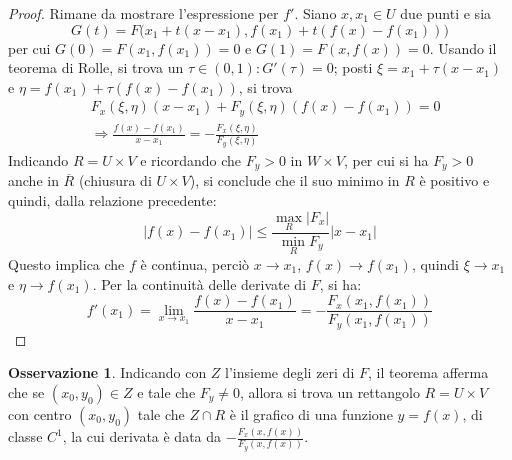 \documentclass[10pt, a4paper]{scrartcl}
\theoremstyle{definition}
\numberwithin{esempio}{section}
\theoremstyle{definition}
\newtheorem{obs}{Osservazione}
\numberwithin{obs}{section}
\numberwithin{nota}{section}
\numberwithin{equation}{subsection}
\begin{document}
\begin{teorema}
\begin{proof}
Rimane da mostrare l'espressione per $f'$.
Siano $x,x_1 \in U$ due punti e sia
\[
G(t)  = F\big(x_1+t(x-x_1),f(x_1) +  t (f(x)-f(x_1))\big)
\] 
per cui $G(0) =  F(x_1,f(x_1))  = 0$ e $G(1) = F(x,f(x))=0$. 
Usando il teorema di Rolle, si trova un $\tau  \in (0,1) :  G'(\tau ) = 0 $; posti $\xi  = x_1 + \tau (x-x_1)$ e $\eta = f(x_1) + \tau (f(x) - f(x_1))$, si trova
\[
\begin{split}
	&F_x(\xi ,\eta) (x-x_1) + F_y(\xi ,\eta)(f(x)-f(x_1)) = 0\\
	&\Rightarrow \frac{f(x) -f(x_1)}{x-x_1} = - \frac{F_x(\xi ,\eta)}{F_y(\xi ,\eta)}
\end{split}
\] 
Indicando $R = U \times V$ e ricordando che $F_y > 0$ in $W\times V$, per cui si ha $F_y > 0$ anche in $\overline{R}$ (chiusura di $U \times V$), si conclude che il suo minimo in $R$ \`e positivo e quindi, dalla relazione precedente:
\[
\lvert f(x) - f(x_1) \rvert \le \frac{\max_R \lvert F_x \rvert }{\min_R F_y}\lvert x-x_1 \rvert 
\] 
Questo implica che $f$ \`e continua, perci\`o $x\to x_1$, $f(x) \to f(x_1)$, quindi $\xi  \to  x_1$ e $\eta \to f(x_1)$.
Per la continuit\`a delle derivate di $F$, si ha:
\[
f'(x_1) =  \lim_{x \to x_1} \frac{f(x) - f(x_1)}{x-x_1}= -  \frac{F_x(x_1,f(x_1))}{F_y(x_1,f(x_1))}
\] 

\end{proof}
\end{teorema}



\begin{obs}
	Indicando con $Z$ l'insieme degli zeri di $F$, il teorema afferma che se $(x_0,y_0) \in Z$ e tale che $F_y\neq 0$, allora si trova un rettangolo $R = U \times V$ con centro $(x_0,y_0)$ tale che $Z \cap R$ \`e il grafico di una funzione $y=f(x)$, di classe $C^1$, la cui derivata \`e data da $-\frac{F_x(x,f(x))}{F_y(x,f(x))}$.
\end{obs}
\end{document}
